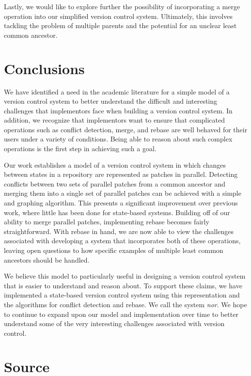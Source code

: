 \documentclass[]{article}
\begin{document}
Lastly, we would like to explore further the possibility of
incorporating a merge operation into our simplified version control
system. Ultimately, this involves tackling the problem of multiple
parents and the potential for an unclear least common ancestor.

\section{Conclusions}

We have identified a need in the academic literature for a simple model
of a version control system to better understand the difficult and
interesting challenges that implementors face when building a version
control system. In addition, we recognize that implementors want to
ensure that complicated operations such as conflict detection, merge,
and rebase are well behaved for their users under a variety of
conditions. Being able to reason about such complex operations is the
first step in achieving such a goal.

Our work establishes a model of a version control system in which
changes between states in a repository are represented as patches in
parallel. Detecting conflicts between two sets of parallel patches from
a common ancestor and merging them into a single set of parallel patches
can be achieved with a simple and graphing algorithm. This presents a
significant improvement over previous work, where little has been done
for state-based systems. Building off of our ability to merge parallel
patches, implementing rebase becomes fairly straightforward. With rebase
in hand, we are now able to view the challenges associated with
developing a system that incorporates both of these operations, leaving
open questions to how specific examples of multiple least common
ancestors should be handled.

We believe this model to particularly useful in designing a version
control system that is easier to understand and reason about. To support
these claims, we have implemented a state-based version control system
using this representation and the algorithms for conflict detection and
rebase. We call the system \emph{nor}. We hope to continue to expand
upon our model and implementation over time to better understand some of
the very interesting challenges associated with version control.

\section{Source}
\end{document}
